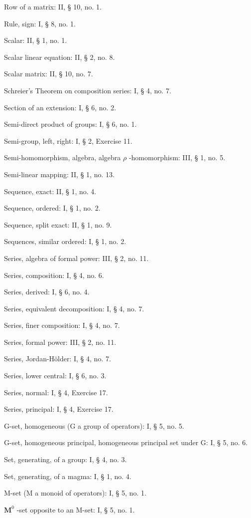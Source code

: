 Row of a matrix: II, § 10, no. 1.

Rule, sign: I, § 8, no. 1.

Scalar: II, § 1, no. 1.

Scalar linear equation: II, § 2, no. 8.

Scalar matrix: II, § 10, no. 7.

Schreier's Theorem on composition series: I, § 4, no. 7.

Section of an extension: I, § 6, no. 2.

Semi-direct product of groups: I, § 6, no. 1.

Semi-group, left, right: I, § 2, Exercise 11.

Semi-homomorphism, algebra, algebra \(\rho\) -homomorphism: III, § 1, no. 5.

Semi-linear mapping: II, § 1, no. 13.

Sequence, exact: II, § 1, no. 4.

Sequence, ordered: I, § 1, no. 2.

Sequence, split exact: II, § 1, no. 9.

Sequences, similar ordered: I, § 1, no. 2.

Series, algebra of formal power: III, § 2, no. 11.

Series, composition: I, § 4, no. 6.

Series, derived: I, § 6, no. 4.

Series, equivalent decomposition: I, § 4, no. 7.

Series, finer composition: I, § 4, no. 7.

Series, formal power: III, § 2, no. 11.

Series, Jordan-Hölder: I, § 4, no. 7.

Series, lower central: I, § 6, no. 3.

Series, normal: I, § 4, Exercise 17.

Series, principal: I, § 4, Exercise 17.

G-set, homogeneous (G a group of operators): I, § 5, no. 5.

G-set, homogeneous principal, homogeneous principal set under G: I, § 5, no. 6.

Set, generating, of a group: I, § 4, no. 3.

Set, generating, of a magma: I, § 1, no. 4.

M-set (M a monoid of operators): I, § 5, no. 1.

\(\mathbf{M}^0\) -set opposite to an M-set: I, § 5, no. 1.

